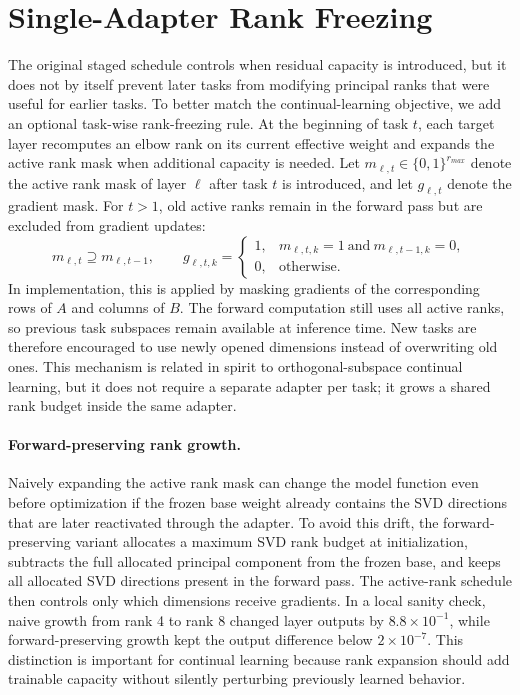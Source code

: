 \documentclass[11pt]{article}
\begin{document}
\section{Single-Adapter Rank Freezing}\label{app:rankfreeze}
The original staged schedule controls when residual capacity is introduced, but it does not by itself prevent later tasks from modifying principal ranks that were useful for earlier tasks. To better match the continual-learning objective, we add an optional task-wise rank-freezing rule. At the beginning of task $t$, each target layer recomputes an elbow rank on its current effective weight and expands the active rank mask when additional capacity is needed. Let $m_{\ell,t}\in\{0,1\}^{r_{max}}$ denote the active rank mask of layer $\ell$ after task $t$ is introduced, and let $g_{\ell,t}$ denote the gradient mask. For $t>1$, old active ranks remain in the forward pass but are excluded from gradient updates:
\begin{equation}
    m_{\ell,t} \supseteq m_{\ell,t-1}, \qquad
    g_{\ell,t,k} =
    \begin{cases}
        1, & m_{\ell,t,k}=1 \ \mathrm{and}\ m_{\ell,t-1,k}=0,\\
        0, & \mathrm{otherwise}.
    \end{cases}
\end{equation}
In implementation, this is applied by masking gradients of the corresponding rows of $A$ and columns of $B$. The forward computation still uses all active ranks, so previous task subspaces remain available at inference time. New tasks are therefore encouraged to use newly opened dimensions instead of overwriting old ones. This mechanism is related in spirit to orthogonal-subspace continual learning, but it does not require a separate adapter per task; it grows a shared rank budget inside the same adapter.

\paragraph{Forward-preserving rank growth.}
Naively expanding the active rank mask can change the model function even before optimization if the frozen base weight already contains the SVD directions that are later reactivated through the adapter. To avoid this drift, the forward-preserving variant allocates a maximum SVD rank budget at initialization, subtracts the full allocated principal component from the frozen base, and keeps all allocated SVD directions present in the forward pass. The active-rank schedule then controls only which dimensions receive gradients. In a local sanity check, naive growth from rank 4 to rank 8 changed layer outputs by $8.8\times 10^{-1}$, while forward-preserving growth kept the output difference below $2\times 10^{-7}$. This distinction is important for continual learning because rank expansion should add trainable capacity without silently perturbing previously learned behavior.
\end{document}

